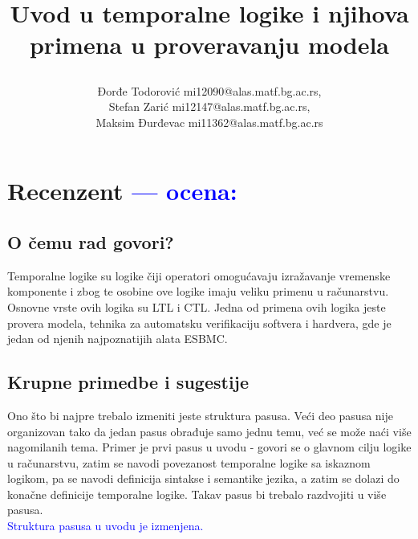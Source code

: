 \documentclass[a4paper]{report}
\newcommand{\odgovor}[1]{\textcolor{blue}{#1}}
\begin{document}
\title{Uvod u temporalne logike i njihova primena u proveravanju modela\\ \small{\author {Đorđe Todorović  mi12090@alas.matf.bg.ac.rs, \\ Stefan Zarić mi12147@alas.matf.bg.ac.rs, \\ Maksim Đurđevac  mi11362@alas.matf.bg.ac.rs}}}

\maketitle

\tableofcontents

\chapter{Recenzent \odgovor{--- ocena:} }

\section{O čemu rad govori?}
Temporalne logike su logike čiji operatori omogućavaju izražavanje vremenske komponente i zbog te osobine ove logike imaju veliku primenu u računarstvu. Osnovne vrste ovih logika su LTL i CTL. Jedna od primena ovih logika jeste provera modela, tehnika za automatsku verifikaciju softvera i hardvera, gde je jedan od njenih najpoznatijih alata ESBMC. 

\section{Krupne primedbe i sugestije}
Ono što bi najpre trebalo izmeniti jeste struktura pasusa. Veći deo pasusa nije organizovan tako da jedan pasus obrađuje samo jednu temu, već se može naći više nagomilanih tema. Primer je prvi pasus u uvodu - govori se o glavnom cilju logike u računarstvu, zatim se navodi povezanost temporalne logike sa iskaznom logikom, pa se navodi definicija sintakse i semantike jezika, a zatim se dolazi do konačne definicije temporalne logike. Takav pasus bi trebalo razdvojiti u više pasusa.\\
\odgovor{Struktura pasusa u uvodu je izmenjena.}
\end{document}
